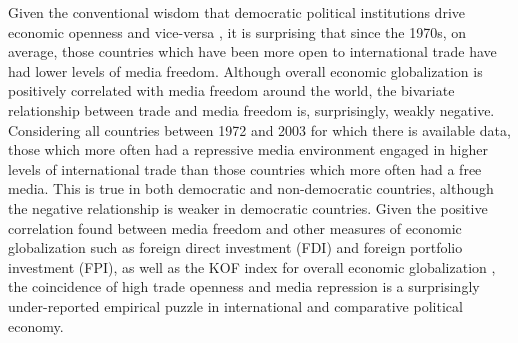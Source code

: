 \documentclass[12pt,a4paper]{article}\usepackage[]{graphicx}\usepackage[]{color}
\begin{document}
\vspace{0.3cm}

Given the conventional wisdom that democratic political institutions drive economic openness \parencite{Milner:2005ci} and vice-versa \parencite{EICHENGREEN:2008gg}, it is surprising that since the 1970s, on average, those countries which have been more open to international trade have had lower levels of media freedom. Although overall economic globalization is positively correlated with media freedom around the world, the bivariate relationship between trade and media freedom is, surprisingly, weakly negative. Considering all countries between 1972 and 2003 for which there is available data, those which more often had a repressive media environment engaged in higher levels of international trade than those countries which more often had a free media. This is true in both democratic and non-democratic countries, although the negative relationship is weaker in democratic countries. Given the positive correlation found between media freedom and other measures of economic globalization such as foreign direct investment (FDI) and foreign portfolio investment (FPI), as well as the KOF index for overall economic globalization \parencite{Dreher:2008dg}, the coincidence of high trade openness and media repression is a surprisingly under-reported empirical puzzle in international and comparative political economy.
\end{document}
